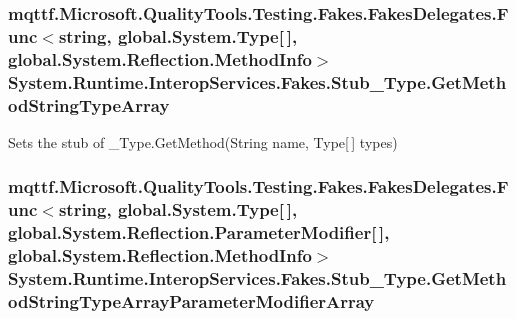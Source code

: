 \hypertarget{class_system_1_1_runtime_1_1_interop_services_1_1_fakes_1_1_stub___type_aa3a040cde0b3d777502e8b062f6fbdaa}{
\subsubsection[{Get\-Method\-String\-Type\-Array}]{\setlength{\rightskip}{0pt plus 5cm}mqttf.\-Microsoft.\-Quality\-Tools.\-Testing.\-Fakes.\-Fakes\-Delegates.\-Func$<$string, global.\-System.\-Type\mbox{[}$\,$\mbox{]}, global.\-System.\-Reflection.\-Method\-Info$>$ System.\-Runtime.\-Interop\-Services.\-Fakes.\-Stub\-\_\-\-Type.\-Get\-Method\-String\-Type\-Array}}\label{class_system_1_1_runtime_1_1_interop_services_1_1_fakes_1_1_stub___type_aa3a040cde0b3d777502e8b062f6fbdaa}


Sets the stub of \-\_\-\-Type.\-Get\-Method(\-String name, Type\mbox{[}$\,$\mbox{]} types)

\hypertarget{class_system_1_1_runtime_1_1_interop_services_1_1_fakes_1_1_stub___type_a5976d348adb70b02e8a6d9b102048ca7}{
\subsubsection[{Get\-Method\-String\-Type\-Array\-Parameter\-Modifier\-Array}]{\setlength{\rightskip}{0pt plus 5cm}mqttf.\-Microsoft.\-Quality\-Tools.\-Testing.\-Fakes.\-Fakes\-Delegates.\-Func$<$string, global.\-System.\-Type\mbox{[}$\,$\mbox{]}, global.\-System.\-Reflection.\-Parameter\-Modifier\mbox{[}$\,$\mbox{]}, global.\-System.\-Reflection.\-Method\-Info$>$ System.\-Runtime.\-Interop\-Services.\-Fakes.\-Stub\-\_\-\-Type.\-Get\-Method\-String\-Type\-Array\-Parameter\-Modifier\-Array}}\label{class_system_1_1_runtime_1_1_interop_services_1_1_fakes_1_1_stub___type_a5976d348adb70b02e8a6d9b102048ca7}


